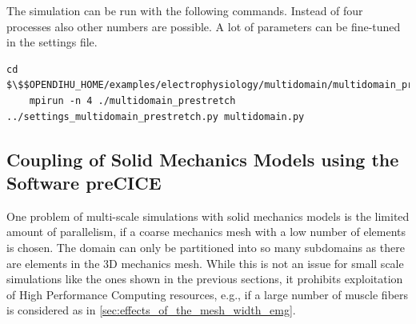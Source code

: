 




\begin{reproduce_no_break}
  The simulation can be run with the following commands. Instead of four processes also other numbers are possible. A lot of parameters can be fine-tuned in the  settings file.
  \begin{lstlisting}[columns=fullflexible,breaklines=true,postbreak=\mbox{\textcolor{gray}{$\hookrightarrow$}\space}]
    cd $\$$OPENDIHU_HOME/examples/electrophysiology/multidomain/multidomain_prestretch/build_release
    mpirun -n 4 ./multidomain_prestretch ../settings_multidomain_prestretch.py multidomain.py
  \end{lstlisting}
\end{reproduce_no_break}


\subsection{Coupling of Solid Mechanics Models using the Software preCICE}\label{sec:volume_coupling_contraction}

One problem of multi-scale simulations with solid mechanics models is the limited amount of parallelism, 
if a coarse mechanics mesh with a low number of elements is chosen. The domain can only be partitioned into so many subdomains as there are elements in the 3D mechanics mesh. While this is not an issue for small scale simulations like the ones shown in the previous sections, it prohibits exploitation of High Performance Computing resources, e.g., if a large number of muscle fibers is considered as in \cref{sec:effects_of_the_mesh_width_emg}.


